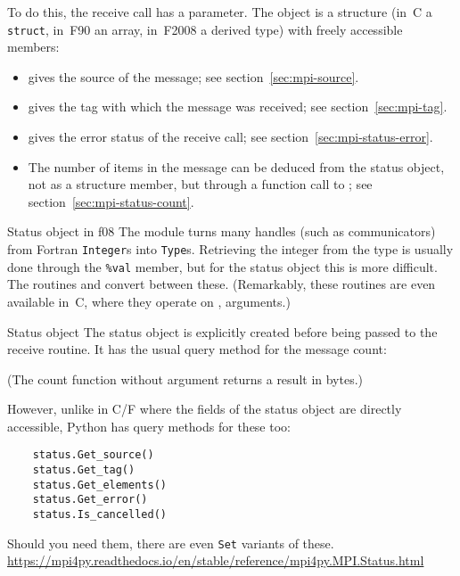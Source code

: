 To do this, the receive call has a  parameter.
The  object
is a structure (in~C a \lstinline{struct}, in~F90 an array, in~F2008 a derived type)
with freely accessible members:
\begin{itemize}
\item {} gives the source of the message;
  see section~\ref{sec:mpi-source}.
\item {} gives the tag with which the message was received;
  see section~\ref{sec:mpi-tag}.
\item {} gives the error status of the receive call;
  see section~\ref{sec:mpi-status-error}.
\item The number of items in the message can be deduced from the status object,
  not as a structure member,
  but through a function call to ;  
  see section~\ref{sec:mpi-status-count}.
\end{itemize}

\begin{fortrannote}{Status object in f08}
  \label{f:status-object}
  The  module turns many handles
  (such as communicators)
  from Fortran \lstinline{Integer}s into \lstinline{Type}s.
  Retrieving the integer from the type is usually done
  through the \lstinline+%val+ member,
  but for the status object this is more difficult.
  The routines  and 
  convert between these.
  (Remarkably, these routines are even available in~C,
  where they operate on ,  arguments.)
\end{fortrannote}

\begin{pythonnote}{Status object}
  The status object is explicitly created before being passed
  to the receive routine. It has the usual query method
  for the message count:

  (The count function without argument returns a result in bytes.)

  However, unlike in C/F where the fields of the status object
  are directly accessible, Python has query methods for these too:
  \begin{lstlisting}
    status.Get_source()
    status.Get_tag()
    status.Get_elements()
    status.Get_error()
    status.Is_cancelled()
  \end{lstlisting}
  Should you need them, there are even \lstinline{Set}
  variants of these.
  \url{https://mpi4py.readthedocs.io/en/stable/reference/mpi4py.MPI.Status.html}
\end{pythonnote}

